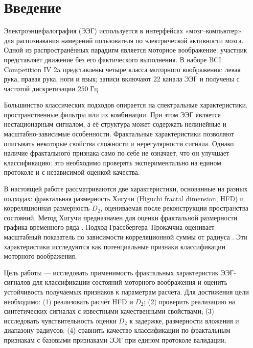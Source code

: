 
\section{Введение}

Электроэнцефалография (ЭЭГ) используется в интерфейсах «мозг--компьютер» для распознавания намерений пользователя по электрической активности мозга. Одной из распространённых парадигм является моторное воображение: участник представляет движение без его фактического выполнения. В наборе BCI Competition IV 2a представлены четыре класса моторного воображения: левая рука, правая рука, ноги и язык; записи включают 22 канала ЭЭГ и получены с частотой дискретизации 250 Гц \cite{Tangermann2012,BCICompetitionIV}.

Большинство классических подходов опирается на спектральные характеристики, пространственные фильтры или их комбинации. При этом ЭЭГ является нестационарным сигналом, а её структура может содержать нелинейные и масштабно-зависимые особенности. Фрактальные характеристики позволяют описывать некоторые свойства сложности и нерегулярности сигнала. Однако наличие фрактального признака само по себе не означает, что он улучшает классификацию: это необходимо проверять экспериментально на едином протоколе и с независимой оценкой качества.

В настоящей работе рассматриваются две характеристики, основанные на разных подходах: фрактальная размерность Хигучи (Higuchi fractal dimension, HFD) и корреляционная размерность $D_2$, оцениваемая после реконструкции пространства состояний. Метод Хигучи предназначен для оценки фрактальной размерности графика временного ряда \cite{Higuchi1988}. Подход Грассбергера--Прокаччиа оценивает масштабный показатель по зависимости корреляционной суммы от радиуса \cite{GrassbergerProcaccia1983}. Эти характеристики исследуются как потенциальные признаки классификации моторного воображения.

Цель работы — исследовать применимость фрактальных характеристик ЭЭГ-сигналов для классификации состояний моторного воображения и оценить устойчивость получаемых признаков к параметрам расчёта. Для достижения цели необходимо: (1) реализовать расчёт HFD и $D_2$; (2) проверить реализацию на синтетических сигналах с известными качественными свойствами; (3) исследовать чувствительность оценки $D_2$ к задержке, размерности вложения и диапазону радиусов; (4) сравнить качество классификации по фрактальным признакам с базовыми признаками ЭЭГ при едином протоколе валидации.

